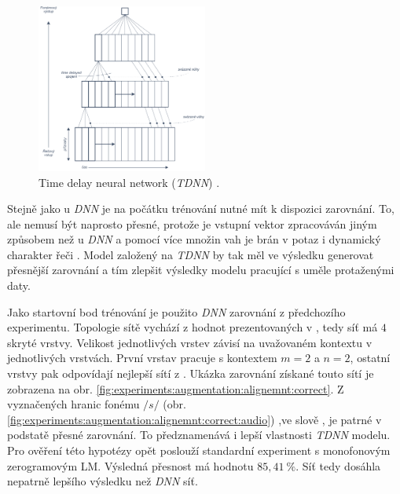 \begin{figure}[hbpt]
  \centering
  \includegraphics[width=0.5\textwidth]{./ch4-experiments/img/tdnn.pdf}
  \caption{Time delay neural network (\textit{TDNN}) .}
  \label{fig:experiments:augmentation:tdnn}
\end{figure}

Stejně jako u \textit{DNN} je na počátku trénování nutné mít k dispozici zarovnání. To, ale nemusí být naprosto přesné, protože je vstupní vektor zpracováván jiným způsobem než u \textit{DNN} a pomocí více množin vah je brán v potaz i dynamický charakter řeči \cite{Peddinti2015}. Model založený na \textit{TDNN} by tak měl ve výsledku generovat přesnější zarovnání a tím zlepšit výsledky modelu pracující s uměle protaženými daty.

Jako startovní bod trénování je použito \textit{DNN} zarovnání z předchozího experimentu. Topologie sítě vychází z hodnot prezentovaných v \cite{Peddinti2015}, tedy síť má $4$ skryté vrstvy. Velikost jednotlivých vrstev závisí na uvažovaném kontextu v jednotlivých vrstvách. První vrstav pracuje s kontextem $m=2$ a $n=2$, ostatní vrstvy pak odpovídají nejlepší sítí z \cite{Peddinti2015}. Ukázka zarovnání získané touto sítí je zobrazena na obr. \ref{fig:experiments:augmentation:alignemnt:correct}. Z vyznačených hranic fonému $/s/$ (obr. \ref{fig:experiments:augmentation:alignemnt:correct:audio}) ,ve slově , je patrné v podstatě přesné zarovnání. To předznamenává i lepší vlastnosti \textit{TDNN} modelu. Pro ověření této hypotézy opět poslouží standardní experiment s monofonovým zerogramovým LM. Výsledná přesnost má hodnotu $85,41\ \%$. Síť tedy dosáhla nepatrně lepšího výsledku než \textit{DNN} síť.

